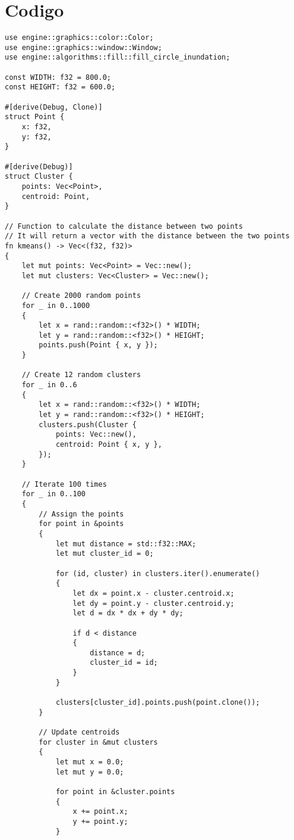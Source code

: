 \documentclass{article}
\begin{document}
\section{Codigo}
\begin{verbatim}
use engine::graphics::color::Color;
use engine::graphics::window::Window;
use engine::algorithms::fill::fill_circle_inundation;

const WIDTH: f32 = 800.0;
const HEIGHT: f32 = 600.0;

#[derive(Debug, Clone)]
struct Point {
    x: f32,
    y: f32,
}

#[derive(Debug)]
struct Cluster {
    points: Vec<Point>,
    centroid: Point,
}

// Function to calculate the distance between two points
// It will return a vector with the distance between the two points
fn kmeans() -> Vec<(f32, f32)>
{
    let mut points: Vec<Point> = Vec::new();
    let mut clusters: Vec<Cluster> = Vec::new();

    // Create 2000 random points
    for _ in 0..1000
    {
        let x = rand::random::<f32>() * WIDTH;
        let y = rand::random::<f32>() * HEIGHT;
        points.push(Point { x, y });
    }

    // Create 12 random clusters
    for _ in 0..6
    {
        let x = rand::random::<f32>() * WIDTH;
        let y = rand::random::<f32>() * HEIGHT;
        clusters.push(Cluster {
            points: Vec::new(),
            centroid: Point { x, y },
        });
    }

    // Iterate 100 times
    for _ in 0..100
    {
        // Assign the points
        for point in &points
        {
            let mut distance = std::f32::MAX;
            let mut cluster_id = 0;

            for (id, cluster) in clusters.iter().enumerate()
            {
                let dx = point.x - cluster.centroid.x;
                let dy = point.y - cluster.centroid.y;
                let d = dx * dx + dy * dy;

                if d < distance
                {
                    distance = d;
                    cluster_id = id;
                }
            }

            clusters[cluster_id].points.push(point.clone());
        }

        // Update centroids
        for cluster in &mut clusters
        {
            let mut x = 0.0;
            let mut y = 0.0;

            for point in &cluster.points
            {
                x += point.x;
                y += point.y;
            }


\end{verbatim}
\end{document}
